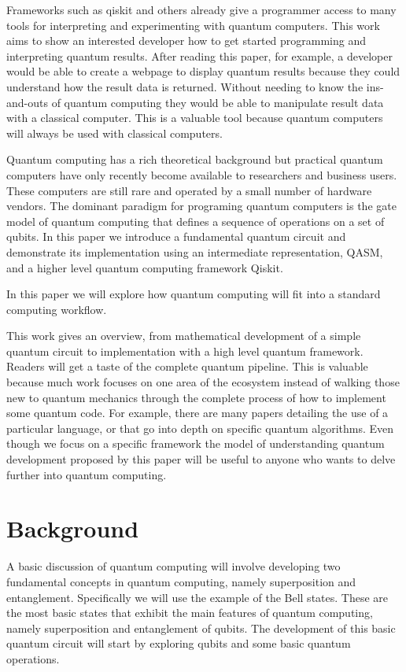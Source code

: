 \documentclass{article}
\begin{document}
Frameworks such as qiskit and others already give a programmer access to many tools for interpreting and experimenting with quantum computers. This work aims to show an interested developer how to get started programming and interpreting quantum results. After reading this paper, for example, a developer would be able to create a webpage to display quantum results because they could understand how the result data is returned. Without needing to know the ins-and-outs of quantum computing they would be able to manipulate result data with a classical computer. This is a valuable tool because quantum computers will always be used with classical computers.

Quantum computing has a rich theoretical background but practical quantum computers have only recently become available to researchers and business users. These computers are still rare and operated by a small number of hardware vendors. The dominant paradigm for programing quantum computers is the gate model of quantum computing that defines a sequence of operations on a set of qubits. In this paper we introduce a fundamental quantum circuit and demonstrate its implementation using an intermediate representation, QASM, and a higher level quantum computing framework Qiskit. 

In this paper we will explore how quantum computing will fit into a standard computing workflow. 

This work gives an overview, from mathematical development of a simple quantum circuit to implementation with a high level quantum framework. Readers will get a taste of the complete quantum pipeline. This is valuable because much work focuses on one area of the ecosystem instead of walking those new to quantum mechanics through the complete process of how to implement some quantum code. For example, there are many papers detailing the use of a particular language, or that go into depth on specific quantum algorithms. Even though we focus on a specific framework the model of understanding quantum development proposed by this paper will be useful to anyone who wants to delve further into quantum computing. 

\section{Background}

A basic discussion of quantum computing will involve developing two fundamental concepts in quantum computing, namely superposition and entanglement.
Specifically we will use the example of the Bell states. These are the most basic states that exhibit the main features of quantum computing, namely superposition and entanglement of qubits. The development of this basic quantum circuit will start by exploring qubits and some basic quantum operations.
\end{document}
